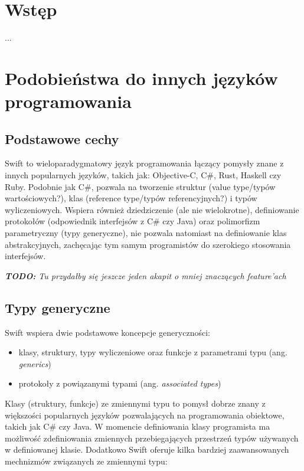 \documentclass[mgr, shortabstract]{iithesis}
\author         {Maksymilian Debeściak}
\newcommand{\todo}[1]{
  \textit{\textbf{TODO: }#1}
}
\begin{document}

\chapter{Wstęp}
\label{ch:wstep}

...

\chapter{Podobieństwa do innych języków programowania}
\label{ch:podobienstwa_do_innych}

\section{Podstawowe cechy}
\label{s:podstawowe_cechy}

Swift to wieloparadygmatowy język programowania łączący pomysły znane z innych popularnych języków, takich jak: Objective-C, C\#, Rust, Haskell czy Ruby. Podobnie jak C\#, pozwala na tworzenie struktur (value type/typów wartościowych?), klas (reference type/typów referencyjnych?) i typów wyliczeniowych. Wspiera również dziedziczenie (ale nie wielokrotne), definiowanie protokołów (odpowiednik interfejsów z C\# czy Java) oraz polimorfizm parametryczny (typy generyczne), nie pozwala natomiast na definiowanie klas abstrakcyjnych, zachęcając tym samym programistów do szerokiego stosowania interfejsów.

\todo{Tu przydałby się jeszcze jeden akapit o mniej znaczących feature'ach}

\section{Typy generyczne}
\label{s:typy_generyczne}

Swift wspiera dwie podstawowe koncepcje generyczności:
\begin{itemize}
  \item klasy, struktury, typy wyliczeniowe oraz funkcje z parametrami typu (ang. \textit{generics})
  \item protokoły z powiązanymi typami (ang. \textit{associated types})
\end{itemize}

Klasy (struktury, funkcje) ze zmiennymi typu to pomysł dobrze znany z większości popularnych języków pozwalających na programowania obiektowe, takich jak C\# czy Java. W momencie definiowania klasy programista ma możliwość zdefiniowania zmiennych przebiegających przestrzeń typów używanych w definiowanej klasie. Dodatkowo Swift oferuje kilka bardziej zaawansowanych mechnizmów związanych ze zmiennymi typu:
\end{document}
